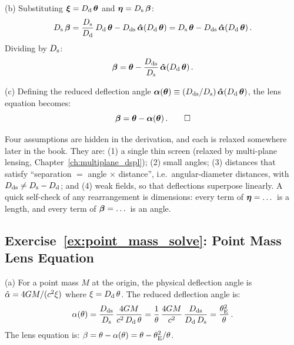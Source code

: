 (b) Substituting $\boldsymbol{\xi} = D_{\mathrm{d}}\,\boldsymbol{\theta}$ and
$\boldsymbol{\eta} = D_{\mathrm{s}}\,\boldsymbol{\beta}$:
\begin{equation*}
    D_{\mathrm{s}}\,\boldsymbol{\beta} = \frac{D_{\mathrm{s}}}{D_{\mathrm{d}}}\,D_{\mathrm{d}}\,\boldsymbol{\theta}
    - D_{\mathrm{ds}}\,\boldsymbol{\hat{\alpha}}(D_{\mathrm{d}}\,\boldsymbol{\theta})
    = D_{\mathrm{s}}\,\boldsymbol{\theta} - D_{\mathrm{ds}}\,\boldsymbol{\hat{\alpha}}(D_{\mathrm{d}}\,\boldsymbol{\theta}) \,.
\end{equation*}
Dividing by $D_{\mathrm{s}}$:
\begin{equation*}
    \boldsymbol{\beta} = \boldsymbol{\theta}
    - \frac{D_{\mathrm{ds}}}{D_{\mathrm{s}}}\,\boldsymbol{\hat{\alpha}}(D_{\mathrm{d}}\,\boldsymbol{\theta}) \,.
\end{equation*}

(c) Defining the reduced deflection angle
$\boldsymbol{\alpha}(\boldsymbol{\theta}) \equiv (D_{\mathrm{ds}}/D_{\mathrm{s}})\,
\boldsymbol{\hat{\alpha}}(D_{\mathrm{d}}\,\boldsymbol{\theta})$, the lens equation becomes:
\begin{equation*}
    \boldsymbol{\beta} = \boldsymbol{\theta} - \boldsymbol{\alpha}(\boldsymbol{\theta}) \,. \qquad \square
\end{equation*}
\begin{annotation}
Four assumptions are hidden in the derivation, and each is relaxed somewhere
later in the book. They are: (1) a single thin screen (relaxed by multi-plane lensing,
Chapter~\ref{ch:multiplane_dspl}); (2) small angles; (3) distances that
satisfy ``separation $=$ angle $\times$ distance'', i.e.\ angular-diameter
distances, with $D_{\mathrm{ds}} \neq D_{\mathrm{s}} - D_{\mathrm{d}}$; and (4) weak fields, so that
deflections superpose linearly. A quick self-check of any rearrangement is
dimensions: every term of $\boldsymbol{\eta} = \dots$ is a length, and every term of
$\boldsymbol{\beta} = \dots$ is an angle.
\end{annotation}

\subsection*{Exercise~\ref{ex:point_mass_solve}: Point Mass Lens Equation}

(a) For a point mass $M$ at the origin, the physical deflection
angle is $\hat{\alpha} = 4G M / (c^2 \xi)$ where
$\xi = D_{\mathrm{d}}\,\theta$.  The reduced deflection angle is:
\begin{equation*}
    \alpha(\theta) = \frac{D_{\mathrm{ds}}}{D_{\mathrm{s}}}\,
    \frac{4G M}{c^2\,D_{\mathrm{d}}\,\theta}
    = \frac{1}{\theta}\,
    \frac{4G M}{c^2}\,\frac{D_{\mathrm{ds}}}{D_{\mathrm{d}}\,D_{\mathrm{s}}}
    = \frac{\theta_{\mathrm{E}}^2}{\theta} \,.
\end{equation*}
The lens equation is:
$\beta = \theta - \alpha(\theta) = \theta - \theta_{\mathrm{E}}^2/\theta$.

